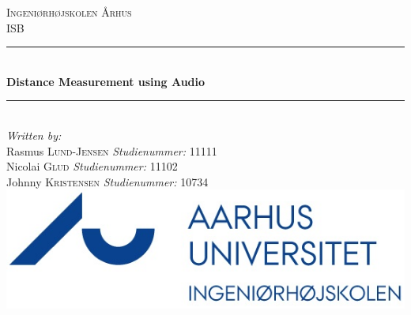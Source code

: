 \newcommand{\HRule}{\rule{\linewidth}{0.5mm}} %

\begin{center} %
 

\textsc{\LARGE Ingeniørhøjskolen Århus}\\[1.5cm] %
\textsc{\LARGE ISB}\\[0.5cm] %


\HRule \\[0.4cm]
{ \huge \bfseries Distance Measurement using Audio}\\[0.4cm] %
\HRule \\[1.5cm]
 

\Large \emph{Written by:}\\
Rasmus \textsc{Lund-Jensen} \textit{Studienummer:} 11111\\
Nicolai \textsc{Glud} \textit{Studienummer:} 11102\\
Johnny \textsc{Kristensen} \textit{Studienummer:} 10734\\



\includegraphics[scale=2]{billeder/iha-logo}\\ %
 

\end{center}
